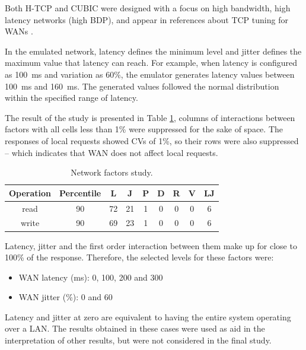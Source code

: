 \documentclass[doublespacing]{bmcart}
\begin{document}
Both H-TCP and CUBIC were designed with a focus on high bandwidth, high latency
networks (high BDP), and appear in references about TCP tuning for WANs
\cite{ESnet2012}.

In the emulated network, latency defines the minimum level and jitter defines
the maximum value that latency can reach. For example, when latency is
configured as 100~ms and variation as 60\%, the emulator generates latency
values between 100~ms and 160~ms. The generated values followed the normal
distribution within the specified range of latency.

The result of the study is presented in Table
\ref{tab:estudo_para_fatores_de_rede}, columns of interactions between factors
with all cells less than 1\% were suppressed for the sake of space. The
responses of local requests showed CVs of 1\%, so their rows were also
suppressed -- which indicates that WAN does not affect local requests.

\begin{table}[h!] 
\caption{Network factors study.} \label{tab:estudo_para_fatores_de_rede}
\begin{tabular}{ccccccccc} \hline

Operation & Percentile & L & J & P & D & R & V & LJ\\\hline

read & 90 & 72 & 21 & 1 & 0 & 0 & 0 & 6\\

write & 90 & 69 & 23 & 1 & 0 & 0 & 0 & 6\\\hline

\end{tabular}

\end{table}

Latency, jitter and the first order interaction between them make up for close to 100\% of the response. Therefore, the selected levels for
these factors were:

\begin{itemize}

\item WAN latency (ms): 0, 100, 200 and 300

\item WAN jitter (\%): 0 and 60

\end{itemize}

Latency and jitter at zero are equivalent to having the entire system operating
over a LAN. The results obtained in these cases were used as aid in the
interpretation of other results, but were not considered in the final study.
\end{document}
